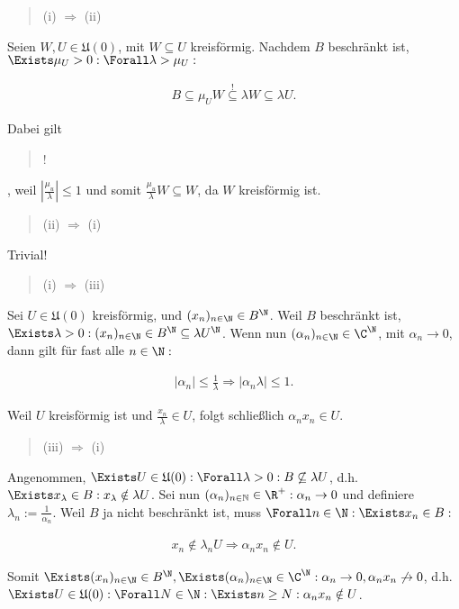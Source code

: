 \begin{solution}

\blockquote{(i) $\Rightarrow$ (ii)}:
Seien $W, U \in \mathfrak{U}(0)$, mit $W \subseteq U$ kreisförmig.
Nachdem $B$ beschränkt ist, $\Exists \mu_U > 0: \Forall \lambda > \mu_U:$

\begin{align*}
  B
  \subseteq
  \mu_U W
  \stackrel{!}{\subseteq}
  \lambda W
  \subseteq
  \lambda U.
\end{align*}

Dabei gilt \blockquote{!}, weil $|\frac{\mu_u}{\lambda}| \leq 1$ und somit $\frac{\mu_u}{\lambda} W \subseteq W$, da $W$ kreisförmig ist. \\

\blockquote{(ii) $\Rightarrow$ (i)}:
Trivial! \\

\blockquote{(i) $\Rightarrow$ (iii)}:
Sei $U \in \mathfrak{U}(0)$ kreisförmig, und $(x_n)_{n \in \N} \in B^\N$.
Weil $B$ beschränkt ist, $\Exists \lambda > 0: (x_n)_{n \in \N} \in B^\N \subseteq \lambda U^\N$.
Wenn nun $(\alpha_n)_{n \in \N} \in \C^\N$, mit $\alpha_n \to 0$, dann gilt für fast alle $n \in \N:$

\begin{align*}
  |\alpha_n| \leq \frac{1}{\lambda}
  \Rightarrow
  |\alpha_n \lambda| \leq 1.
\end{align*}

Weil $U$ kreisförmig ist und $\frac{x_n}{\lambda} \in U$, folgt schließlich $\alpha_n x_n \in U$. \\

\blockquote{(iii) $\Rightarrow$ (i)}:
Angenommen, $\Exists U \in \mathfrak{U}(0): \Forall \lambda > 0: B \not \subseteq \lambda U$, d.h. $\Exists x_\lambda \in B: x_\lambda \notin \lambda U$.
Sei nun $(\alpha_n)_{n\in\mathbb{N}} \in \R^+: \alpha_n \to 0$ und definiere $\lambda_n := \frac{1}{\alpha_n}$.
Weil $B$ ja nicht beschränkt ist, muss $\Forall n \in \N: \Exists x_n \in B:$

\begin{align*}
  x_n \notin \lambda_n U
  \Rightarrow
  \alpha_n x_n \notin U.
\end{align*}

Somit $\Exists (x_n)_{n \in \N} \in B^\N, \Exists (\alpha_n)_{n \in \N} \in \C^\N: \alpha_n \to 0, \alpha_n x_n \not \to 0$, d.h. $\Exists U \in \mathfrak{U}(0): \Forall N \in \N: \Exists n \geq N: \alpha_n x_n \notin U$.

\end{solution}

